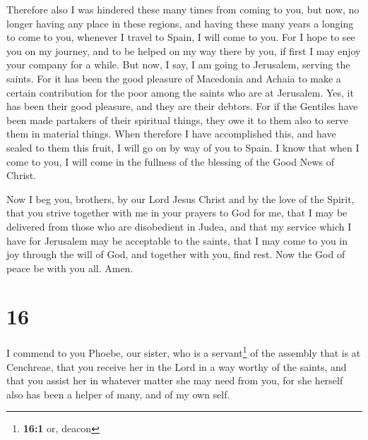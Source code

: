  Therefore also I was hindered these many times from
coming to you,  but now, no longer having any place in
these regions, and having these many years a longing to come to you,
 whenever I travel to Spain, I will come to you. For I
hope to see you on my journey, and to be helped on my way there by you,
if first I may enjoy your company for a while.  But now,
I say, I am going to Jerusalem, serving the saints.  For
it has been the good pleasure of Macedonia and Achaia to make a certain
contribution for the poor among the saints who are at Jerusalem.
 Yes, it has been their good pleasure, and they are their
debtors. For if the Gentiles have been made partakers of their spiritual
things, they owe it to them also to serve them in material things.
 When therefore I have accomplished this, and have sealed
to them this fruit, I will go on by way of you to Spain. 
I know that when I come to you, I will come in the fullness of the
blessing of the Good News of Christ.

 Now I beg you, brothers, by our Lord Jesus Christ and by
the love of the Spirit, that you strive together with me in your prayers
to God for me,  that I may be delivered from those who
are disobedient in Judea, and that my service which I have for Jerusalem
may be acceptable to the saints,  that I may come to you
in joy through the will of God, and together with you, find rest.
 Now the God of peace be with you all. Amen.

\hypertarget{section-15}{%
\section{16}\label{section-15}}

 I commend to you Phoebe, our sister, who is a
servant\footnote{\textbf{16:1} or, deacon} of the assembly that is at
Cenchreae,  that you receive her in the Lord in a way
worthy of the saints, and that you assist her in whatever matter she may
need from you, for she herself also has been a helper of many, and of my
own self.


